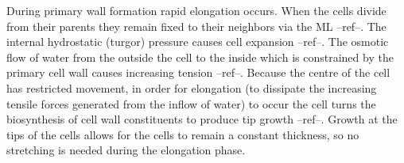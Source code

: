 During primary wall formation rapid elongation occurs. When the cells divide
from their parents they remain fixed to their neighbors via the ML
--ref--. The internal hydrostatic (turgor) pressure causes cell expansion
--ref--. The osmotic flow of water from the outside the cell to the inside which
is constrained by the primary cell wall causes increasing tension --ref--.
Because the centre of the cell has restricted movement, in order for elongation
(to dissipate the increasing tensile forces generated from the inflow of water)
to occur the cell turns the biosynthesis of cell wall constituents to produce
tip growth --ref--. Growth at the tips of the cells allows for the cells to
remain a constant thickness, so no stretching is needed during the elongation
phase.